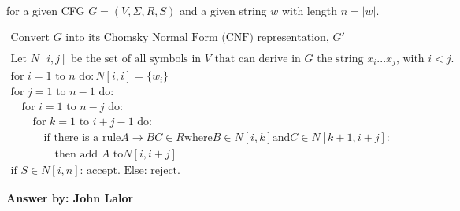 \documentclass[12pt]{article}
\begin{document}
\begin{enumerate}
\begin{itemize}
for a given CFG $G = (V, \Sigma, R, S)$ and a given string $w$ with length $n = |w|$. 

\[
\begin{array}{l}
\textrm{Convert $G$ into its Chomsky Normal Form (CNF) representation, $G'$} \\ \\
\textrm{Let $N[i,j]$ be the set of all symbols in $V$ that can derive in $G$ the string $x_i...x_j$, with $i < j$.} \\
\textrm{for $i = 1$ to $n$ do}: N[i,i] = \{w_i\} \\
\textrm{for $j = 1$ to $n-1$ do}: \\
\quad \textrm{for $i = 1$ to $n-j$ do}: \\
\quad\quad \textrm{for $k = 1$ to $i+j-1$ do}: \\
\quad\quad\quad \textrm{if there is a rule} A \rightarrow BC \in R \textrm{where} B \in N[i,k] \textrm{and} C \in N[k+1,i+j]: \\
\quad\quad\quad\quad \textrm{then add $A$ to} N[i, i+j]\\
\textrm{if } S \in N[i,n] \textrm{: accept. Else: reject.} 
\end{array}
\]

\end{itemize}
{\bf Answer by: John Lalor} 

\end{enumerate}
\end{document}
